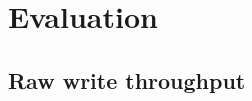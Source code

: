 \documentclass{vldb}
\newcommand{\rowss}{Rose's\xspace}
\begin{document}






\section{Evaluation}

\subsection{Raw write throughput}
\end{document}
